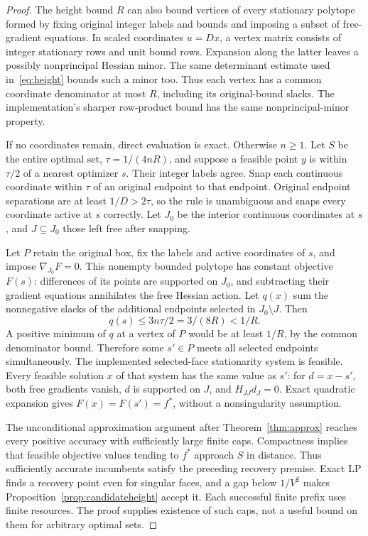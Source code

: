 \documentclass[11pt]{article}
\theoremstyle{remark}
\newcommand{\OPT}{f^*}
\begin{document}
\begin{proof}
The height bound $R$ can also bound vertices of every stationary
polytope formed by fixing original integer labels and bounds and imposing
a subset of free-gradient equations. In scaled coordinates $u=Dx$, a
vertex matrix consists of integer stationary rows and unit bound rows.
Expansion along the latter leaves a possibly nonprincipal Hessian minor.
The same determinant estimate used in~\eqref{eq:height} bounds such a
minor too. Thus each vertex has a common coordinate denominator at most
$R$, including its original-bound slacks. The implementation's sharper
row-product bound has the same nonprincipal-minor property.

If no coordinates remain, direct evaluation is exact. Otherwise $n\ge1$.
Let $S$ be the entire optimal set, $\tau=1/(4nR)$, and suppose a feasible
point $y$ is within $\tau/2$ of a nearest optimizer $s$. Their integer
labels agree. Snap each continuous coordinate within $\tau$ of an
original endpoint to that endpoint. Original endpoint separations are
at least $1/D>2\tau$, so the rule is unambiguous and snaps every
coordinate active at $s$ correctly. Let $J_0$ be the interior continuous
coordinates at $s$, and $J\subseteq J_0$ those left free after snapping.

Let $P$ retain the original box, fix the labels and active coordinates
of $s$, and impose $\nabla_{J_0}F=0$. This nonempty bounded polytope
has constant objective $F(s)$: differences of its points are supported
on $J_0$, and subtracting their gradient equations annihilates the free
Hessian action. Let $q(x)$ sum the nonnegative slacks of the additional
endpoints selected in $J_0\setminus J$. Then
\[
q(s)\le3n\tau/2=3/(8R)<1/R.
\]
A positive minimum of $q$ at a vertex of $P$ would be at least $1/R$,
by the common denominator bound. Therefore some $s'\in P$ meets all
selected endpoints simultaneously. The implemented selected-face
stationarity system is feasible. Every feasible solution $x$ of that
system has the same value as $s'$: for $d=x-s'$, both free gradients
vanish, $d$ is supported on $J$, and $H_{JJ}d_J=0$. Exact quadratic
expansion gives $F(x)=F(s')=\OPT$, without a nonsingularity assumption.

The unconditional approximation argument after
Theorem~\ref{thm:approx} reaches every positive accuracy with sufficiently
large finite caps. Compactness implies that feasible objective values
tending to $\OPT$ approach $S$ in distance. Thus sufficiently accurate
incumbents satisfy the preceding recovery premise. Exact LP finds a
recovery point even for singular faces, and a gap below $1/V^2$ makes
Proposition~\ref{prop:candidateheight} accept it. Each successful finite
prefix uses finite resources. The proof supplies existence of such caps,
not a useful bound on them for arbitrary optimal sets.
\end{proof}
\end{document}
